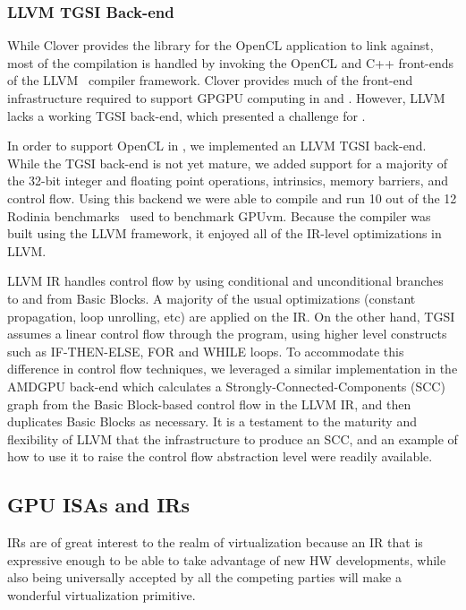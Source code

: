 \subsubsection{LLVM TGSI Back-end}
\label{ssec:tgsi_backend}
While Clover provides the library for the OpenCL application to link against,
most of the compilation is handled by invoking the OpenCL and C++ front-ends
of the LLVM~\cite{lattner2004llvm} compiler framework. Clover provides much of
the front-end infrastructure required to support GPGPU computing in \XenSVGA
and \Trillium. However, LLVM lacks a working TGSI back-end, which presented a
challenge for \XenSVGA.

In order to support OpenCL in \XenSVGA, we implemented an LLVM TGSI back-end.
While the TGSI back-end is not yet mature, we added support for a majority of
the 32-bit integer and floating point operations, intrinsics, memory barriers,
and control flow. Using this backend we were able to compile and run 10 out of
the 12 Rodinia benchmarks~\cite{che2009rodinia} used to benchmark GPUvm.
Because the compiler was built using the LLVM framework, it enjoyed all of the
IR-level optimizations in LLVM.

LLVM IR handles control flow by using conditional and unconditional branches
to and from Basic Blocks. A majority of the usual optimizations (constant
propagation, loop unrolling, etc) are applied on the IR. On the other hand,
TGSI assumes a linear control flow through the program, using higher level
constructs such as IF-THEN-ELSE, FOR and WHILE loops. To accommodate this
difference in control flow techniques, we leveraged a similar implementation
in the AMDGPU back-end which calculates a Strongly-Connected-Components (SCC)
graph from the Basic Block-based control flow in the LLVM IR, and then
duplicates Basic Blocks as necessary. It is a testament to the maturity and
flexibility of LLVM that the infrastructure to produce an SCC, and an example
of how to use it to raise the control flow abstraction level were readily
available.

\subsection{GPU ISAs and IRs}

IRs are of great interest to the realm of virtualization because an IR that is expressive enough to be able to take advantage of new HW developments, while also being universally accepted by all the competing parties will make a wonderful virtualization primitive.

